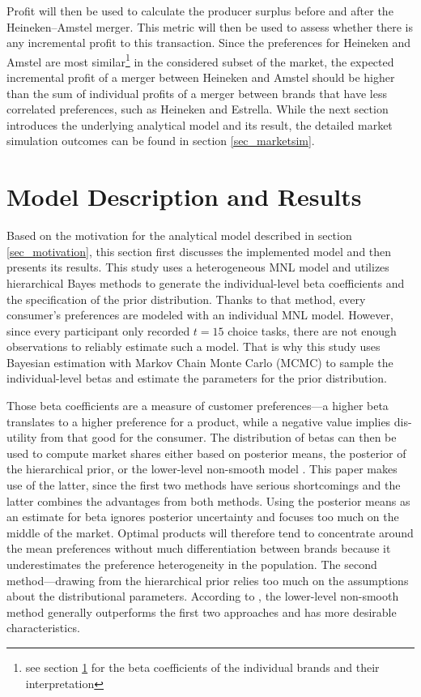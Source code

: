 \documentclass[12pt,a4paper]{article}
\begin{document}
Profit will then be used to calculate the producer surplus before and after the Heineken--Amstel merger.
This metric will then be used to assess whether there is any incremental profit to this transaction.
Since the preferences for Heineken and Amstel are most similar\footnote{see section \ref{sec_model} for the beta coefficients of the individual brands and their interpretation} in the considered subset of the market, the expected incremental profit of a merger between Heineken and Amstel should be higher than the sum of individual profits of a merger between brands that have less correlated preferences, such as Heineken and Estrella.
While the next section introduces the underlying analytical model and its result, the detailed market simulation outcomes can be found in section \ref{sec_marketsim}.


\section{Model Description and Results} \label{sec_model}

Based on the motivation for the analytical model described in section \ref{sec_motivation}, this section first discusses the implemented model and then presents its results.
This study uses a heterogeneous MNL model and utilizes hierarchical Bayes methods to generate the individual-level beta coefficients and the specification of the prior distribution.
Thanks to that method, every consumer's preferences are modeled with an individual MNL model.
However, since every participant only recorded $t=15$ choice tasks, there are not enough observations to reliably estimate such a model.
That is why this study uses Bayesian estimation with Markov Chain Monte Carlo (MCMC) to sample the individual-level betas and estimate the parameters for the prior distribution.

Those beta coefficients are a measure of customer preferences---a higher beta translates to a higher preference for a product, while a negative value implies dis-utility from that good for the consumer.
The distribution of betas can then be used to compute market shares either based on posterior means, the posterior of the hierarchical prior, or the lower-level non-smooth model \citep{pachaliHowGeneralizeHierarchical2017}.
This paper makes use of the latter, since the first two methods have serious shortcomings and the latter combines the advantages from both methods.
Using the posterior means as an estimate for beta ignores posterior uncertainty and focuses too much on the middle of the market.
Optimal products will therefore tend to concentrate around the mean preferences without much differentiation between brands because it underestimates the preference heterogeneity in the population.
The second method---drawing from the hierarchical prior relies too much on the assumptions about the distributional parameters. 
According to \cite{pachaliHowGeneralizeHierarchical2017}, the lower-level non-smooth method generally outperforms the first two approaches and has more desirable characteristics.
\end{document}
